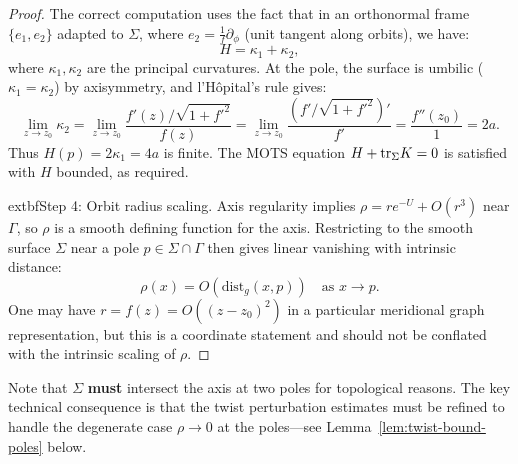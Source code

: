 \begin{proof}
The correct computation uses the fact that in an orthonormal frame $\{e_1, e_2\}$ adapted to $\Sigma$, where $e_2 = \frac{1}{f}\partial_\phi$ (unit tangent along orbits), we have:
\[
H = \kappa_1 + \kappa_2,
\]
where $\kappa_1, \kappa_2$ are the principal curvatures. At the pole, the surface is umbilic ($\kappa_1 = \kappa_2$) by axisymmetry, and l'H\^opital's rule gives:
\[
\lim_{z \to z_0} \kappa_2 = \lim_{z \to z_0} \frac{f'(z)/\sqrt{1+f'^2}}{f(z)} = \lim_{z \to z_0} \frac{(f'/\sqrt{1+f'^2})'}{f'} = \frac{f''(z_0)}{1} = 2a.
\]
Thus $H(p) = 2\kappa_1 = 4a$ is finite. The MOTS equation $H + \mathrm{tr}_\Sigma K = 0$ is satisfied with $H$ bounded, as required.

	extbf{Step 4: Orbit radius scaling.}
Axis regularity implies $\rho = r e^{-U} + O(r^3)$ near $\Gamma$, so $\rho$ is a smooth defining function for the axis. Restricting to the smooth surface $\Sigma$ near a pole $p\in\Sigma\cap\Gamma$ then gives linear vanishing with intrinsic distance:
\[
\rho(x) = O(\mathrm{dist}_g(x,p))\quad \text{as } x\to p.
\]
One may have $r=f(z)=O((z-z_0)^2)$ in a particular meridional graph representation, but this is a coordinate statement and should not be conflated with the intrinsic scaling of $\rho$.
\end{proof}

\begin{remark}\label{rem:axis-correction}
Note that $\Sigma$ \textbf{must} intersect the axis at two poles for topological reasons. The key technical consequence is that the twist perturbation estimates must be refined to handle the degenerate case $\rho \to 0$ at the poles---see Lemma~\ref{lem:twist-bound-poles} below.
\end{remark}

